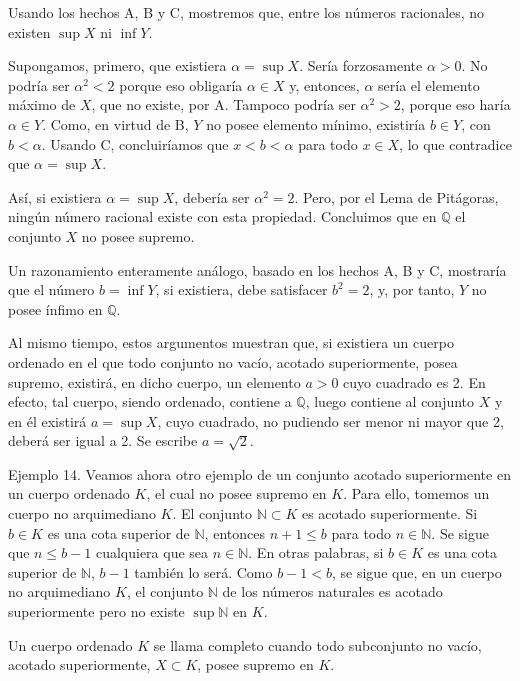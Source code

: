 \documentclass[12pt,oneside]{book}
\begin{document}
Usando los hechos A, B y C, mostremos que, entre los números racionales, no existen \( \sup X \) ni \( \inf Y \).

Supongamos, primero, que existiera \( \alpha = \sup X \). Sería forzosamente \( \alpha > 0 \). No podría ser \( \alpha^2 < 2 \) porque eso obligaría \( \alpha \in X \) y, entonces, \( \alpha \) sería el elemento máximo de \( X \), que no existe, por A. Tampoco podría ser \( \alpha^2 > 2 \), porque eso haría \( \alpha \in Y \). Como, en virtud de B, \( Y \) no posee elemento mínimo, existiría \( b \in Y \), con \( b < \alpha \). Usando C, concluiríamos que \( x < b < \alpha \) para todo \( x \in X \), lo que contradice que \( \alpha = \sup X \).

Así, si existiera \( \alpha = \sup X \), debería ser \( \alpha^2 = 2 \). Pero, por el Lema de Pitágoras, ningún número racional existe con esta propiedad. Concluimos que en \( \mathbb{Q} \) el conjunto \( X \) no posee supremo.

Un razonamiento enteramente análogo, basado en los hechos A, B y C, mostraría que el número \( b = \inf Y \), si existiera, debe satisfacer \( b^2 = 2 \), y, por tanto, \( Y \) no posee ínfimo en \( \mathbb{Q} \).

Al mismo tiempo, estos argumentos muestran que, si existiera un cuerpo ordenado en el que todo conjunto no vacío, acotado superiormente, posea supremo, existirá, en dicho cuerpo, un elemento \( a > 0 \) cuyo cuadrado es 2. En efecto, tal cuerpo, siendo ordenado, contiene a \( \mathbb{Q} \), luego contiene al conjunto \( X \) y en él existirá \( a = \sup X \), cuyo cuadrado, no pudiendo ser menor ni mayor que 2, deberá ser igual a 2. Se escribe \( a = \sqrt{2} \).

Ejemplo 14. Veamos ahora otro ejemplo de un conjunto acotado superiormente en un cuerpo ordenado \( K \), el cual no posee supremo en \( K \). Para ello, tomemos un cuerpo no arquimediano \( K \). El conjunto \( \mathbb{N} \subset K \) es acotado superiormente. Si \( b \in K \) es una cota superior de \( \mathbb{N} \), entonces \( n + 1 \leq b \) para todo \( n \in \mathbb{N} \). Se sigue que \( n \leq b - 1 \) cualquiera que sea \( n \in \mathbb{N} \). En otras palabras, si \( b \in K \) es una cota superior de \( \mathbb{N} \), \( b - 1 \) también lo será. Como \( b - 1 < b \), se sigue que, en un cuerpo no arquimediano \( K \), el conjunto \( \mathbb{N} \) de los números naturales es acotado superiormente pero no existe \( \sup \mathbb{N} \) en \( K \).

Un cuerpo ordenado \( K \) se llama completo cuando todo subconjunto no vacío, acotado superiormente, \( X \subset K \), posee supremo en \( K \).
\end{document}
